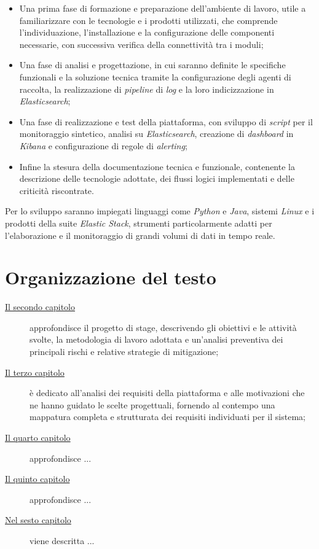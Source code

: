 \begin{itemize}
    \item Una prima fase di formazione e preparazione dell'ambiente di lavoro, utile a familiarizzare con le tecnologie e i prodotti utilizzati, che comprende l'individuazione, l'installazione e la configurazione delle componenti necessarie, con successiva verifica della connettività tra i moduli;
    \item Una fase di analisi e progettazione, in cui saranno definite le specifiche funzionali e la soluzione tecnica tramite la configurazione degli agenti di raccolta, la realizzazione di \emph{pipeline} di \emph{log} e la loro indicizzazione in \emph{Elasticsearch};
    \item Una fase di realizzazione e test della piattaforma, con sviluppo di \emph{script} per il monitoraggio sintetico, analisi su \emph{Elasticsearch}, creazione di \emph{dashboard} in \emph{Kibana} e configurazione di regole di \emph{alerting};
    \item Infine la stesura della documentazione tecnica e funzionale, contenente la descrizione delle tecnologie adottate, dei flussi logici implementati e delle criticità riscontrate.
\end{itemize}

Per lo sviluppo saranno impiegati linguaggi come \emph{Python} e \emph{Java}, sistemi \emph{Linux} e i prodotti della suite \emph{Elastic Stack}, strumenti particolarmente adatti per l'elaborazione e il monitoraggio di grandi volumi di dati in tempo reale.


\section{Organizzazione del testo}

\begin{description}
    \item[{\hyperref[cap:descrizione-stage]{Il secondo capitolo}}] approfondisce il progetto di stage, descrivendo gli obiettivi e le attività svolte, la metodologia di lavoro adottata e un'analisi preventiva dei principali rischi e relative strategie di mitigazione;

    \item[{\hyperref[cap:analisi-requisiti]{Il terzo capitolo}}] è dedicato all'analisi dei requisiti della piattaforma e alle motivazioni che ne hanno guidato le scelte progettuali, fornendo al contempo una mappatura completa e strutturata dei requisiti individuati per il sistema;

    \item[{\hyperref[cap:progettazione-codifica]{Il quarto capitolo}}] approfondisce ...
    
    \item[{\hyperref[cap:verifica-validazione]{Il quinto capitolo}}] approfondisce ...
    
    \item[{\hyperref[cap:conclusioni]{Nel sesto capitolo}}] viene descritta ...
\end{description}

